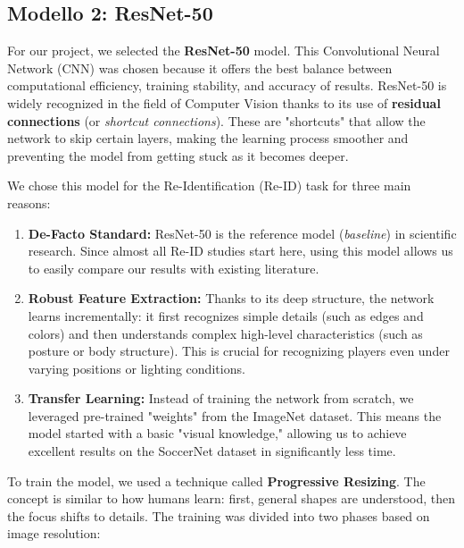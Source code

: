 \documentclass[10pt,twocolumn,letterpaper]{article}
\begin{document}
\subsection{Modello 2: ResNet-50}
For our project, we selected the \textbf{ResNet-50} \cite{resnet50} model. This Convolutional Neural Network (CNN) was chosen because it offers the best balance between computational efficiency, training stability, and accuracy of results. ResNet-50 is widely recognized in the field of Computer Vision thanks to its use of \textbf{residual connections} (or \textit{shortcut connections}). These are "shortcuts" that allow the network to skip certain layers, making the learning process smoother and preventing the model from getting stuck as it becomes deeper.

We chose this model for the Re-Identification (Re-ID) task for three main reasons:

\begin{enumerate}
    \item \textbf{De-Facto Standard:} ResNet-50 is the reference model (\textit{baseline}) in scientific research. Since almost all Re-ID studies start here, using this model allows us to easily compare our results with existing literature.
    
    \item \textbf{Robust Feature Extraction:} Thanks to its deep structure, the network learns incrementally: it first recognizes simple details (such as edges and colors) and then understands complex high-level characteristics (such as posture or body structure). This is crucial for recognizing players even under varying positions or lighting conditions.
    
    \item \textbf{Transfer Learning:} Instead of training the network from scratch, we leveraged pre-trained "weights" from the ImageNet dataset. This means the model started with a basic "visual knowledge," allowing us to achieve excellent results on the SoccerNet dataset in significantly less time.
\end{enumerate}

To train the model, we used a technique called \textbf{Progressive Resizing}. The concept is similar to how humans learn: first, general shapes are understood, then the focus shifts to details. The training was divided into two phases based on image resolution:
\end{document}
